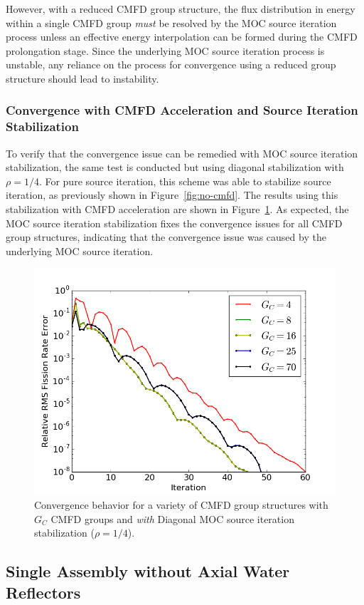 However, with a reduced \ac{CMFD} group structure, the flux distribution in energy within a single \ac{CMFD} group \textit{must} be resolved by the \ac{MOC} source iteration process unless an effective energy interpolation can be formed during the \ac{CMFD} prolongation stage. Since the underlying \ac{MOC} source iteration process is unstable, any reliance on the process for convergence using a reduced group structure should lead to instability.

\subsubsection{Convergence with CMFD Acceleration and Source Iteration Stabilization}

To verify that the convergence issue can be remedied with \ac{MOC} source iteration stabilization, the same test is conducted but using diagonal stabilization with $\rho = 1/4$. For pure source iteration, this scheme was able to stabilize source iteration, as previously shown in Figure~\ref{fig:no-cmfd}. The results using this stabilization with \ac{CMFD} acceleration are shown in Figure~\ref{fig:sa-cmfd-stab}. As expected, the \ac{MOC} source iteration stabilization fixes the convergence issues for all \ac{CMFD} group structures, indicating that the convergence issue was caused by the underlying \ac{MOC} source iteration.
\begin{figure}[ht!]
	\centering
	\includegraphics[width=0.65\linewidth]{figures/convergence/sa_stab_cmfd.png}
	\caption{Convergence behavior for a variety of \ac{CMFD} group structures with $G_C$ \ac{CMFD} groups and \textit{with} Diagonal \ac{MOC} source iteration stabilization ($\rho = 1/4$).}
	\label{fig:sa-cmfd-stab}
\end{figure}

\subsection{Single Assembly without Axial Water Reflectors}
\label{sec:sa-no-axial-ref}

